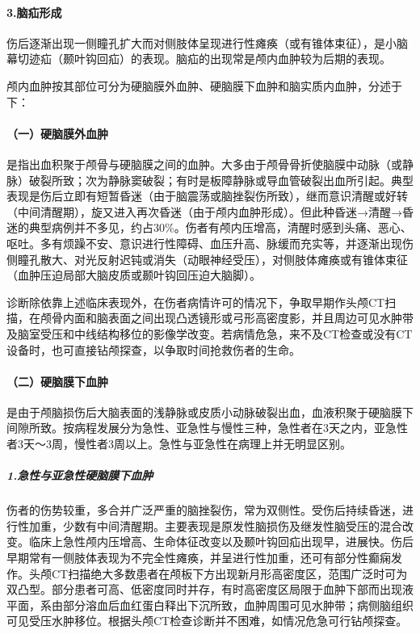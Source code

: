 \paragraph{3.脑疝形成}

伤后逐渐出现一侧瞳孔扩大而对侧肢体呈现进行性瘫痪（或有锥体束征），是小脑幕切迹疝（颞叶钩回疝）的表现。脑疝的出现常是颅内血肿较为后期的表现。

颅内血肿按其部位可分为硬脑膜外血肿、硬脑膜下血肿和脑实质内血肿，分述于下：

\paragraph{（一）硬脑膜外血肿}

是指出血积聚于颅骨与硬脑膜之间的血肿。大多由于颅骨骨折使脑膜中动脉（或静脉）破裂所致；次为静脉窦破裂；有时是板障静脉或导血管破裂出血所引起。典型表现是伤后立即有短暂昏迷（由于脑震荡或脑挫裂伤所致），继而意识清醒或好转（中间清醒期），旋又进入再次昏迷（由于颅内血肿形成）。但此种昏迷→清醒→昏迷的典型病例并不多见，约占30\%。伤者有颅内压增高，清醒时感到头痛、恶心、呕吐。多有烦躁不安、意识进行性障碍、血压升高、脉缓而充实等，并逐渐出现伤侧瞳孔散大、对光反射迟钝或消失（动眼神经受压），对侧肢体瘫痪或有锥体束征（血肿压迫局部大脑皮质或颞叶钩回压迫大脑脚）。

诊断除依靠上述临床表现外，在伤者病情许可的情况下，争取早期作头颅CT扫描，在颅骨内面和脑表面之间出现凸透镜形或弓形高密度影，并且周边可见水肿带及脑室受压和中线结构移位的影像学改变。若病情危急，来不及CT检查或没有CT设备时，也可直接钻颅探查，以争取时间抢救伤者的生命。

\paragraph{（二）硬脑膜下血肿}

是由于颅脑损伤后大脑表面的浅静脉或皮质小动脉破裂出血，血液积聚于硬脑膜下间隙所致。按病程发展分为急性、亚急性与慢性三种，急性者在3天之内，亚急性者3天～3周，慢性者3周以上。急性与亚急性在病理上并无明显区别。

\subparagraph{1.急性与亚急性硬脑膜下血肿}

伤者的伤势较重，多合并广泛严重的脑挫裂伤，常为双侧性。受伤后持续昏迷，进行性加重，少数有中间清醒期。主要表现是原发性脑损伤及继发性脑受压的混合改变。临床上急性颅内压增高、生命体征改变以及颞叶钩回疝出现早，进展快。伤后早期常有一侧肢体表现为不完全性瘫痪，并呈进行性加重，还可有部分性癫痫发作。头颅CT扫描绝大多数患者在颅板下方出现新月形高密度区，范围广泛时可为双凸型。部分患者可高、低密度同时并存，有时高密度区局限于血肿下部而出现液平面，系由部分溶血后血红蛋白释出下沉所致，血肿周围可见水肿带；病侧脑组织可见受压水肿移位。根据头颅CT检查诊断并不困难，如情况危急可行钻颅探查。


